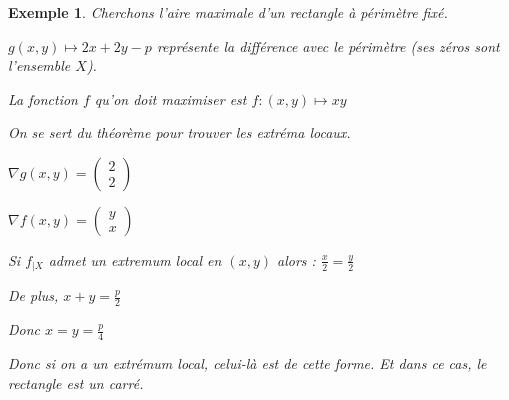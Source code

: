 \documentclass[a4paper,12pt]{book}
\newtheorem{Exe}{Exemple}[section]
\begin{document}
\begin{Exe}
Cherchons l'aire maximale d'un rectangle à périmètre fixé.
\par $g(x,y)\mapsto 2x+2y-p$ représente la différence avec le périmètre (ses zéros sont l'ensemble $X$).
\par La fonction $f$ qu'on doit maximiser est $f:(x,y)\mapsto xy$
\par On se sert du théorème pour trouver les extréma locaux.
\par $\nabla g (x,y) = \begin{pmatrix} 2 \\ 2\end{pmatrix}$
\par $\nabla f (x,y) = \begin{pmatrix} y \\ x\end{pmatrix}$
\par Si $f_{|X}$ admet un extremum local en $(x,y)$ alors : $\frac{x}{2}=\frac{y}{2}$
\par De plus, $x+y=\frac{p}{2}$
\par Donc $x=y=\frac{p}{4}$
\par Donc si on a un extrémum local, celui-là est de cette forme. Et dans ce cas, le rectangle est un carré.
\end{Exe}
\end{document}

